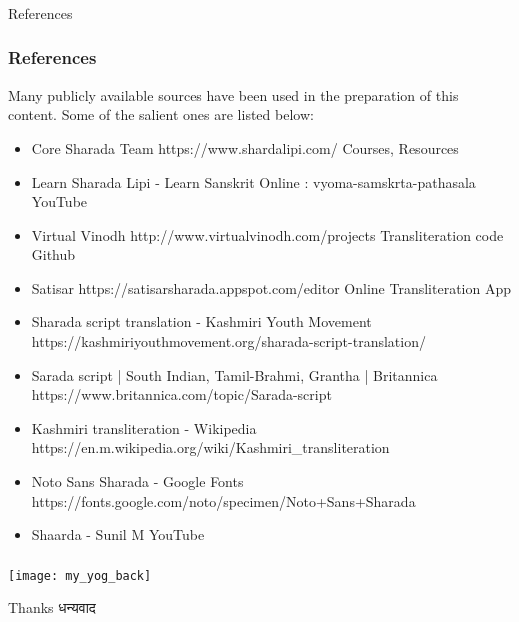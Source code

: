 \begin{frame}[fragile]\frametitle{}
\begin{center}
{\Large References}
\end{center}
\end{frame}


\begin{frame}[fragile]\frametitle{References}

Many publicly available sources have been used in the preparation of this content. Some of the salient ones are listed below:

	\begin{itemize}
	\item Core Sharada Team https://www.shardalipi.com/ Courses, Resources
	\item Learn Sharada Lipi - Learn Sanskrit Online : vyoma-samskrta-pathasala YouTube %
	\item Virtual Vinodh http://www.virtualvinodh.com/projects Transliteration code Github
	\item Satisar https://satisarsharada.appspot.com/editor Online Transliteration App
	\item Sharada script translation - Kashmiri Youth Movement https://kashmiriyouthmovement.org/sharada-script-translation/
	\item Sarada script | South Indian, Tamil-Brahmi, Grantha | Britannica https://www.britannica.com/topic/Sarada-script
	\item Kashmiri transliteration - Wikipedia https://en.m.wikipedia.org/wiki/Kashmiri\_transliteration
	\item Noto Sans Sharada - Google Fonts https://fonts.google.com/noto/specimen/Noto+Sans+Sharada
	\item Shaarda - Sunil M YouTube %
	\end{itemize}

\end{frame}


\begin{frame}[fragile]\frametitle{}

\begin{center}
\texttt{[image: my\_yog\_back]}

Thanks धन्यवाद
\end{center}

\end{frame}
